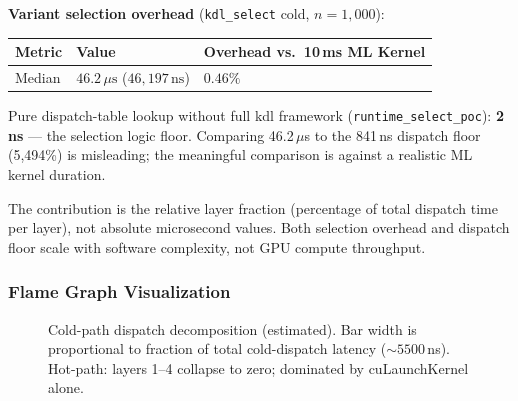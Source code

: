 \documentclass[11pt]{article}
\begin{document}
\textbf{Variant selection overhead} (\texttt{kdl\_select} cold, \(n=1{,}000\)):

\begin{center}
\begin{tabular}{lll}
  \toprule
  Metric & Value & Overhead vs.\ 10\,ms ML Kernel \\
  \midrule
  Median & $46.2\,\mu\text{s}$ ($46{,}197\,\text{ns}$) & $0.46\%$ \\
  \bottomrule
\end{tabular}
\end{center}

\footnotesize{Pure dispatch-table lookup without full kdl framework (\texttt{runtime\_select\_poc}): \textbf{2\,ns} --- the selection logic floor.
Comparing 46.2\,$\mu$s to the 841\,ns dispatch floor (5{,}494\%) is misleading; the meaningful comparison is against a realistic ML kernel duration.}\normalsize

The contribution is the relative layer fraction (percentage of total dispatch time per layer), not absolute microsecond values.
Both selection overhead and dispatch floor scale with software complexity, not GPU compute throughput.

\subsubsection{Flame Graph Visualization}

\begin{figure}[H]
  \centering
  \caption{Cold-path dispatch decomposition (estimated). Bar width is proportional to fraction of total
    cold-dispatch latency (${\sim}5500$\,ns). Hot-path: layers 1--4 collapse to zero; dominated by
    cuLaunchKernel alone.}
\end{figure}
\end{document}
